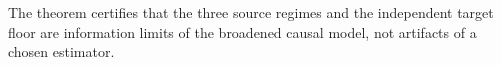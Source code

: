 The theorem certifies that the three source regimes and the independent target floor are information limits of the broadened causal model, not artifacts of a chosen estimator.